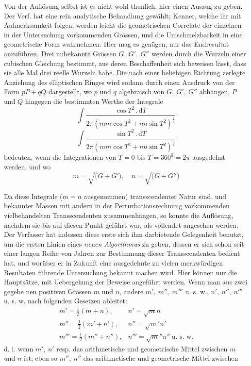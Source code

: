 Von der Auflösung selbst ist es nicht wohl thunlich, hier einen Auszug zu
geben. Der Verf. hat eine rein analytische Behandlung gewählt; Kenner, welche
ihr mit Aufmerksamkeit folgen, werden leicht die geometrischen Correlate der
einzelnen in der Untersuchung vorkommenden Grössen, und die Umschmelzbarkeit in eine geometrische Form wahrnehmen. Hier mag es genügen, nur das
Endresultat anzuführen. Drei unbekannte Grössen $G,\ G',\ G''$ werden durch
die Wurzeln einer cubischen Gleichung bestimmt, aus deren Beschaffenheit sich
beweisen lässt, dass sie alle Mal drei reelle Wurzeln habe. Die nach einer beliebigen Richtung zerlegte Anziehung des elliptischen Ringes wird sodann durch
einen Ausdruck von der Form $pP+qQ$ dargestellt, wo $p$ und $q$ algebraisch
von $G,\ G',\ G''$ abhängen, $P$ und $Q$ hingegen die bestimmten Werthe der Integrale
\[
\int\frac{\cos T^{2}\,.\,\mathrm{d}T}
{2\pi(mm\cos T^{2}+nn\sin T^{2})^{\frac{3}{2}}}
\]
\[
\int\frac{\sin T^{2}\,.\,\mathrm{d}T}
{2\pi(mm\cos T^{2}+nn\sin T^{2})^{\frac{3}{2}}}
\]
bedeuten, wenn die Integrationen von $T=0$ bis $T=360^{0}=2\pi$ ausgedehnt
werden, und wo
\[
m=\surd(G+G'),\quad n=\surd(G+G'')
\]
\par Da diese Integrale ($m=n$ ausgenommen) transscendenter Natur sind. und bekannter Massen mit andern in der Perturbationsrechnung vorkommenden vielbehandelten Transscendenten zusammenhängen, so konnte die Auflösung, nachdem
sie bis auf diesen Punkt geführt war, als vollendet angesehen werden. Der Verfasser hat indessen diese erste sich ihm darbietende Gelegenheit benutzt, um die
ersten Linien eines \textit{neuen Algorithmus} zu geben, dessen er sich schon seit einer
langen Reihe von Jahren zur Bestimmung dieser Transscendenten bedient hat, und
worüber er in Zukunft eine ausgedehnte zu vielen merkwürdigen Resultaten führende Untersuchung bekannt machen wird. Hier können nur die Hauptsätze,
mit Uebergehung der Beweise angeführt werden. Wenn man aus zwei gegebe%
nen positiven Grössen $m$ und $n$, andere $m',\ m'',\ m'''$ u. s. w., $n',\ n'',\ n'''$ u. s. w. nach
folgenden Gesetzen ableitet:
\[
\begin{array}{ll}
m'=\frac{1}{2}(m+n),&n'=\surd mn\\[0.4em]
m''=\frac{1}{2}(m'+n'),&n''=\surd m'n'\\[0.4em]
m'''=\frac{1}{2}(m''+n''),&n'''=\surd m''n''\ \mbox{u. s. w.}
\end{array}
\]
d. i. wenn $m',\ n'$ resp. das arithmetische und geometrische Mittel zwischen $m$
und $n$ ist; eben so $m'',\ n''$ das arithmetische und geometrische Mittel zwischen
